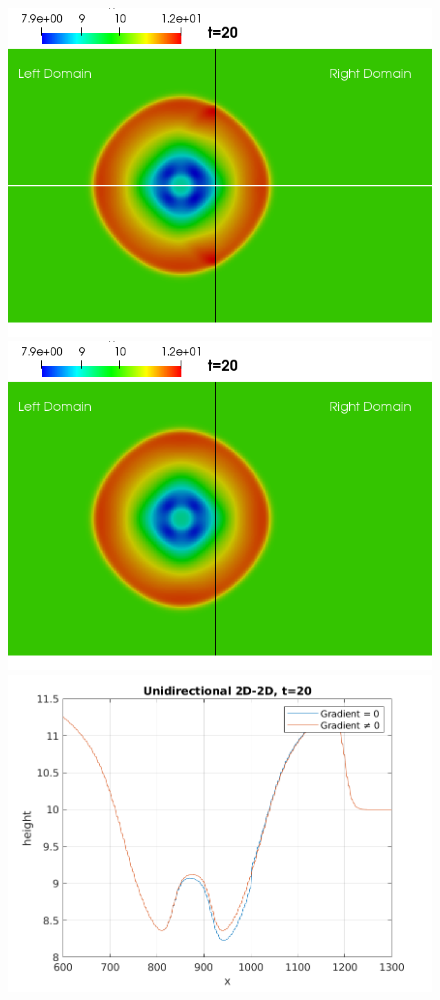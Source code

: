 \begin{frame}
\begin{figure}[htp]
\centering
\includegraphics[scale=0.35]{./Resources/Images/unidirectional20_g_0.png}\hfill
\includegraphics[scale=0.35]{./Resources/Images/unidirectional20_g_bueno.png}\hfill
\includegraphics[scale=0.5]{./Resources/Images/unidirectional_graph.png}


\end{figure}
\end{frame}
